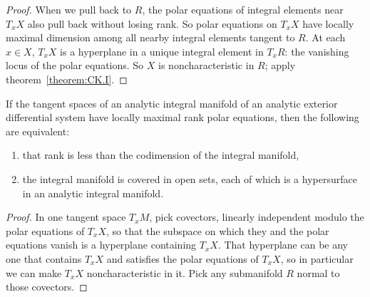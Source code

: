 \begin{proof}
When we pull back to \(R\), the polar equations of integral elements  near \(T_x X\) also pull back without losing rank.
So polar equations on \(T_x X\) have locally maximal dimension among all nearby integral elements tangent to \(R\).
At each \(x\in X\), \(T_x X\) is a hyperplane in a unique integral element in \(T_x R\): the vanishing locus of the polar equations.
So \(X\) is noncharacteristic in \(R\); apply theorem~\vref{theorem:CK.I}.
\end{proof}
\begin{corollary}\label{corollary:local.CK}
If the tangent spaces of an analytic integral manifold of an analytic exterior differential system have locally maximal rank polar equations, then the following are equivalent:
\begin{enumerate}
\item that rank is less than the codimension of the integral manifold,
\item the integral manifold is covered in open sets, each of which is a hypersurface in an analytic integral manifold.
\end{enumerate}
\end{corollary}
\begin{proof}
In one tangent space \(T_x M\), pick covectors, linearly independent modulo the polar equations of \(T_x X\), so that the subspace on which they and the polar equations vanish is a hyperplane containing \(T_x X\).
That hyperplane can be any one that contains \(T_x X\) and satisfies the polar equations of \(T_x X\), so in particular we can make \(T_x X\) noncharacteristic in it.
Pick any submanifold \(R\) normal to those covectors.
\end{proof}

